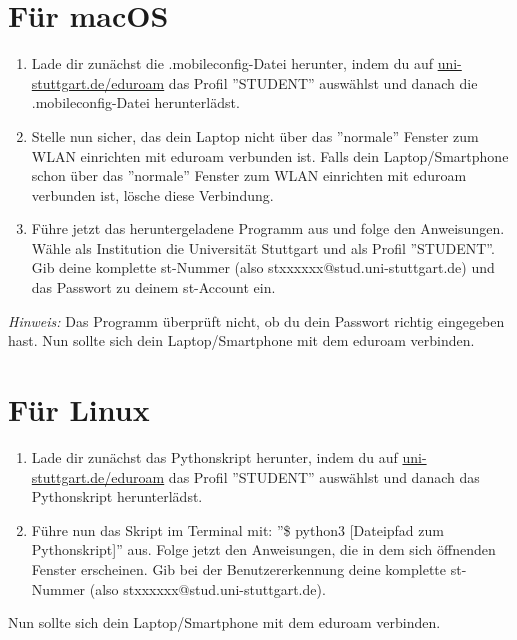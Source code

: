 \section*{Für macOS}
\begin{enumerate}[label=\arabic*.]
    \item Lade dir zunächst die .mobileconfig-Datei herunter, indem du auf \href{\eduroamurllinux}{uni-stuttgart.de/eduroam} das Profil ''STUDENT'' auswählst und danach die .mobileconfig-Datei herunterlädst.\newline
    \item Stelle nun sicher, das dein Laptop nicht über das ''normale'' Fenster zum WLAN einrichten mit eduroam verbunden ist. Falls dein Laptop/Smartphone schon über das ''normale'' Fenster zum WLAN einrichten mit eduroam verbunden ist, lösche diese Verbindung.\newline
    \item Führe jetzt das heruntergeladene Programm aus und folge den Anweisungen. Wähle als Institution die Universität Stuttgart und als Profil ''STUDENT''. Gib deine komplette st-Nummer (also stxxxxxx@stud.uni-stuttgart.de) und das Passwort zu deinem st-Account ein.\newline
\end{enumerate}
\textit{Hinweis:} Das Programm überprüft nicht, ob du dein Passwort richtig eingegeben hast.\newline
Nun sollte sich dein Laptop/Smartphone mit dem eduroam verbinden.

\section*{Für Linux}
\begin{enumerate}[label=\arabic*.]
    \item Lade dir zunächst das Pythonskript herunter, indem du auf \href{\eduroamurllinux}{uni-stuttgart.de/eduroam} das Profil ''STUDENT'' auswählst und danach das Pythonskript herunterlädst.
    \item Führe nun das Skript im Terminal mit: ''\$ python3 [Dateipfad zum Pythonskript]'' aus. 
    Folge jetzt den Anweisungen, die in dem sich öffnenden Fenster erscheinen. 
    Gib bei der Benutzererkennung deine komplette st-Nummer (also stxxxxxx@stud.uni-stuttgart.de).
\end{enumerate}
Nun sollte sich dein Laptop/Smartphone mit dem eduroam verbinden.
